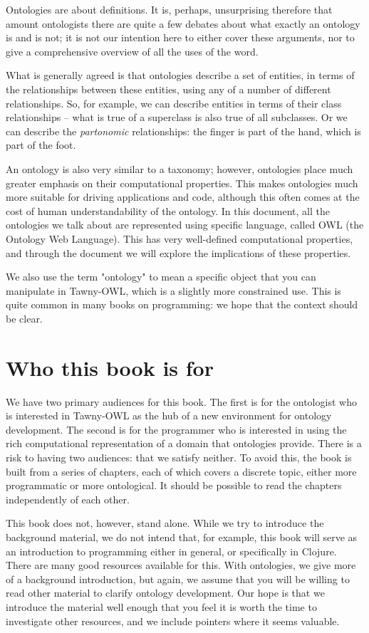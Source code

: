 Ontologies are about definitions. It is, perhaps, unsurprising therefore
that amount ontologists there are quite a few debates about what exactly
an ontology is and is not; it is not our intention here to either cover
these arguments, nor to give a comprehensive overview of all the uses of
the word.

What is generally agreed is that ontologies describe a set of entities,
in terms of the relationships between these entities, using any of a
number of different relationships. So, for example, we can describe
entities in terms of their class relationships -- what is true of a
superclass is also true of all subclasses. Or we can describe the
\emph{partonomic} relationships: the finger is part of the hand, which is
part of the foot.

An ontology is also very similar to a taxonomy; however, ontologies
place much greater emphasis on their computational properties. This
makes ontologies much more suitable for driving applications and code,
although this often comes at the cost of human understandability of the
ontology. In this document, all the ontologies we talk about are
represented using specific language, called OWL (the Ontology Web
Language). This has very well-defined computational properties, and
through the document we will explore the implications of these
properties.

We also use the term "ontology" to mean a specific object that you can
manipulate in Tawny-OWL, which is a slightly more constrained use. This is
quite common in many books on programming: we hope that the context should be
clear.

\section{Who this book is for}
\label{sec:who-this-book}

We have two primary audiences for this book. The first is for the ontologist
who is interested in Tawny-OWL as the hub of a new environment for ontology
development. The second is for the programmer who is interested in using the
rich computational representation of a domain that ontologies provide. There
is a risk to having two audiences: that we satisfy neither. To avoid this, the
book is built from a series of chapters, each of which covers a discrete
topic, either more programmatic or more ontological. It should be possible to
read the chapters independently of each other.

This book does not, however, stand alone. While we try to introduce the
background material, we do not intend that, for example, this book will serve
as an introduction to programming either in general, or specifically in
Clojure. There are many good resources available for this. With
ontologies, we give more of a background introduction, but again, we assume
that you will be willing to read other material to clarify ontology
development. Our hope is that we introduce the material well enough that you
feel it is worth the time to investigate other resources, and we include
pointers where it seems valuable.




